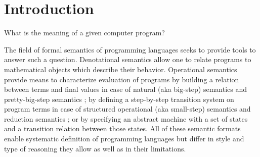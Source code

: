 \chapter{Introduction}\label{chapter:introduction}


What is the meaning of a given computer program?

The field of formal semantics of programming languages seeks to provide tools to answer such a question.
Denotational semantics \cite{scott-denotational-semantics} allow one to relate programs to mathematical objects which describe their behavior.
Operational semantics provide means to characterize evaluation of programs by building a relation between terms and final values in case of natural (aka big-step) semantics \cite{kahn-natural-semantics} and pretty-big-step semantics \cite{pretty-big-step-semantics}; by defining a step-by-step transition system on program terms in case of structured operational (aka small-step) semantics \cite{plotkin-sos} and reduction semantics \cite{felleisen-reduction-semantics};
 or by specifying an abstract machine with a set of states and a transition relation between those states.
All of these semantic formats enable systematic definition of programming languages but differ in style and type of reasoning they allow as well as in their limitations. 

